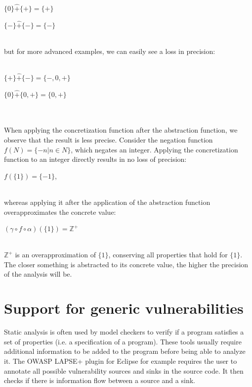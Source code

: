 \begin{exmp}
\centerline{$\{0\}  \hat{+}  \{+\} = \{+\}$}
\centerline{$\{-\}  \hat{+}  \{-\} = \{-\}$}
\leavevmode \\
but for more advanced examples, we can easily see a loss in precision:\\\\
\centerline{$\{+\}  \hat{+}  \{-\} = \{-,0,+\}$}
\centerline{$\{0\}  \hat{+}  \{0,+\} = \{0,+\}$}
\\\\
When applying the concretization function after the abstraction function, we observe that the result is less precise. Consider the negation function $f(N) = \{-n \vert n \in N\}$, which negates an integer. Applying the concretization function to an integer directly results in no loss of precision:\\ 
\centerline{$f(\{1\}) = \{-1\}$,}\\ whereas applying it after the application of the abstraction function overapproximates the concrete value: \\
\centerline{$(\gamma \circ f \circ \alpha)(\{1\}) = \mathbb{Z}^+$}\\
$\mathbb{Z}^+$ is an overapproximation of $\{1\}$, conserving all properties that hold for $\{1\}$. The closer something is abstracted to its concrete value, the higher the precision of the analysis will be.
\end{exmp}


\section{Support for generic vulnerabilities}
\label{sec:genericVulnerabilities}

Static analysis is often used by model checkers to verify if a program satisfies a set of properties (i.e. a specification of a program). These tools usually require additional information to be added to the program before being able to analyze it. The OWASP LAPSE+ plugin for Eclipse\cite{OWASP:LAPSE} for example requires the user to annotate all possible vulnerability sources and sinks in the source code. It then checks if there is information flow between a source and a sink. 

